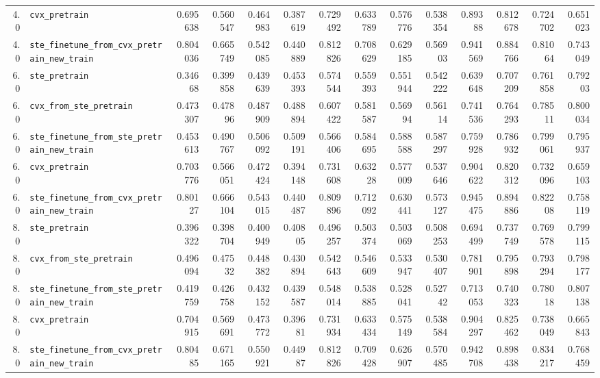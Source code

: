 \begin{longtable}{@{}r l *{12}{r}@{}}
4.0 & \texttt{cvx\_pretrain} & 0.695638 & 0.560547 & 0.464983 & 0.387619 & 0.729492 & 0.633789 & 0.576776 & 0.538354 & 0.89388 & 0.812678 & 0.724702 & 0.651023 \\
4.0 & \texttt{ste\_finetune\_from\_cvx\_pretrain\_new\_train} & 0.804036 & 0.665749 & 0.542085 & 0.440889 & 0.812826 & 0.708629 & 0.629185 & 0.56903 & 0.941569 & 0.884766 & 0.81064 & 0.743049 \\
6.0 & \texttt{ste\_pretrain} & 0.34668 & 0.399858 & 0.439639 & 0.453393 & 0.574544 & 0.559393 & 0.551944 & 0.542222 & 0.639648 & 0.707209 & 0.761858 & 0.79203 \\
6.0 & \texttt{cvx\_from\_ste\_pretrain} & 0.473307 & 0.47896 & 0.487909 & 0.488894 & 0.607422 & 0.581587 & 0.56994 & 0.56114 & 0.741536 & 0.764293 & 0.78511 & 0.800034 \\
6.0 & \texttt{ste\_finetune\_from\_ste\_pretrain\_new\_train} & 0.453613 & 0.490767 & 0.506092 & 0.509191 & 0.566406 & 0.584695 & 0.588588 & 0.587297 & 0.759928 & 0.786932 & 0.799061 & 0.795937 \\
6.0 & \texttt{cvx\_pretrain} & 0.703776 & 0.566051 & 0.472424 & 0.394148 & 0.731608 & 0.63228 & 0.577009 & 0.537646 & 0.904622 & 0.820312 & 0.732096 & 0.659103 \\
6.0 & \texttt{ste\_finetune\_from\_cvx\_pretrain\_new\_train} & 0.80127 & 0.666104 & 0.543015 & 0.440487 & 0.809896 & 0.712092 & 0.630441 & 0.573127 & 0.945475 & 0.894886 & 0.82208 & 0.758119 \\
8.0 & \texttt{ste\_pretrain} & 0.396322 & 0.398704 & 0.400949 & 0.40805 & 0.496257 & 0.503374 & 0.503069 & 0.508253 & 0.694499 & 0.737749 & 0.769578 & 0.799115 \\
8.0 & \texttt{cvx\_from\_ste\_pretrain} & 0.496094 & 0.47532 & 0.448382 & 0.430894 & 0.542643 & 0.546609 & 0.533947 & 0.530407 & 0.781901 & 0.795898 & 0.793294 & 0.798177 \\
8.0 & \texttt{ste\_finetune\_from\_ste\_pretrain\_new\_train} & 0.419759 & 0.426758 & 0.432152 & 0.439587 & 0.548014 & 0.538885 & 0.528041 & 0.52742 & 0.713053 & 0.740323 & 0.78018 & 0.807138 \\
8.0 & \texttt{cvx\_pretrain} & 0.704915 & 0.569691 & 0.473772 & 0.39681 & 0.731934 & 0.633434 & 0.575149 & 0.538584 & 0.904297 & 0.825462 & 0.738049 & 0.665843 \\
8.0 & \texttt{ste\_finetune\_from\_cvx\_pretrain\_new\_train} & 0.80485 & 0.671165 & 0.550921 & 0.44987 & 0.812826 & 0.709428 & 0.626907 & 0.570485 & 0.942708 & 0.898438 & 0.834217 & 0.768459 \\

\end{longtable}
